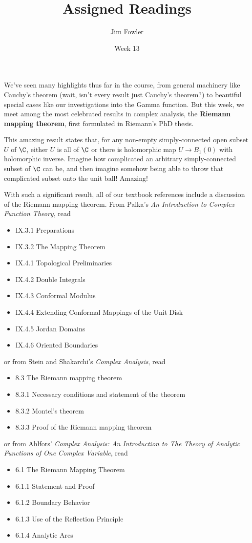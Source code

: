 \documentclass{homework}
\author{Jim Fowler}
\title{Assigned Readings}
\date{Week 13}
\begin{document}
\maketitle

We've seen many highlights thus far in the course, from general
machinery like Cauchy's theorem (wait, isn't every result just
Cauchy's theorem?) to beautiful special cases like our investigations
into the Gamma function.  But this week, we meet among the most
celebrated results in complex analysis, the \textbf{Riemann mapping
  theorem}, first formulated in Riemann's PhD thesis.

This amazing result states that, for any non-empty simply-connected
open subset $U$ of $\C$, either $U$ is all of $\C$ or there is
holomorphic map $U \to B_1(0)$ with holomorphic inverse.  Imagine how
complicated an arbitrary simply-connected subset of $\C$ can be, and
then imagine somehow being able to throw that complicated subset onto
the unit ball!  Amazing!

With such a significant result, all of our textbook references include
a discussion of the Riemann mapping theorem.  From Palka's \textit{An
  Introduction to Complex Function Theory}, read
\begin{itemize}
\item IX.3.1 Preparations
\item IX.3.2 The Mapping Theorem
\item IX.4.1 Topological Preliminaries
\item IX.4.2 Double Integrals
\item IX.4.3 Conformal Modulus
\item IX.4.4 Extending Conformal Mappings of the Unit Disk
\item IX.4.5 Jordan Domains
\item IX.4.6 Oriented Boundaries
\end{itemize}
or from Stein and Shakarchi's \textit{Complex Analysis}, read
\begin{itemize}
\item 8.3 The Riemann mapping theorem
\item 8.3.1 Necessary conditions and statement of the theorem
\item 8.3.2 Montel's theorem
\item 8.3.3 Proof of the Riemann mapping theorem
\end{itemize}
or from Ahlfors' \textit{Complex Analysis: An Introduction to The Theory of Analytic Functions of One Complex Variable}, read
\begin{itemize}
\item 6.1 The Riemann Mapping Theorem
\item 6.1.1 Statement and Proof
\item 6.1.2 Boundary Behavior
\item 6.1.3 Use of the Reflection Principle
\item 6.1.4 Analytic Arcs
\end{itemize}
\end{document}
